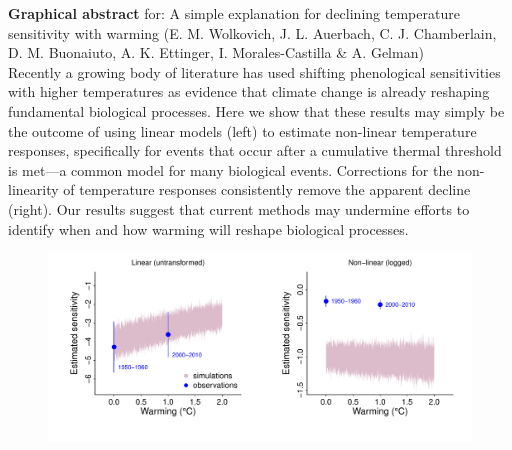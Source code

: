 \documentclass[11pt,letter]{article}
\begin{document}
{\bf Graphical abstract} for: A simple explanation for declining temperature sensitivity with warming (E. M. Wolkovich,  J. L. Auerbach, C. J. Chamberlain, D. M. Buonaiuto, A. K. Ettinger, I. Morales-Castilla \& A. Gelman)\\

Recently a growing body of literature has used shifting phenological sensitivities with higher temperatures as evidence that climate change is already reshaping fundamental biological processes. Here we show that these results may simply be the outcome of using linear models (left) to estimate non-linear temperature responses, specifically for events that occur after a cumulative thermal threshold is met---a common model for many biological events. Corrections for the non-linearity of temperature responses consistently remove the apparent decline (right). Our results suggest that current methods may undermine efforts to identify when and how warming will reshape biological processes.\\

\begin{figure}[h!]
\centering
\noindent \includegraphics[width=1.05\textwidth]{..//analyses/figures/basicsimsandpepalt1.pdf} 
\end{figure}
\end{document}
